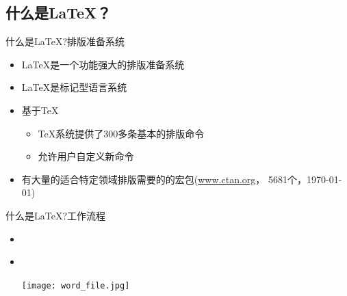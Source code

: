 \documentclass[xcolor=svgnames, t, aspectratio=169]{ctexbeamer}
\begin{document}
\subsection[是什么？]{什么是\LaTeX ？}\label{sec01-02}
\begin{frame}[t]{什么是\LaTeX?}{排版准备系统}
  \stretchon
  \begin{itemize}
  \item \LaTeX{}是一个功能强大的排版准备系统
  \item \LaTeX{}是标记型语言系统
  \item 基于\TeX
    \begin{itemize}
    \item \TeX{}系统提供了300多条基本的排版命令
    \item 允许用户自定义新命令
    \end{itemize}
  \item 有大量的适合特定领域排版需要的的宏包(\url{www.ctan.org}，
    \alert{5681}个，\today )
  \end{itemize}
  \stretchoff
\end{frame}

\begin{frame}[t]{什么是\LaTeX?}{工作流程}
  \begin{itemize}
  \item \wysiwym\\[4ex]
    \begin{center}
    \end{center}
    \vspace{4ex}
  \item \wysiwyg\\[4ex]
    \begin{center}
      \texttt{[image: word\_file.jpg]}
    \end{center}
  \end{itemize}
\end{frame}
\end{document}
